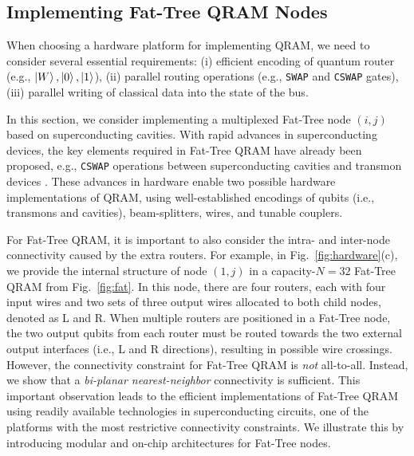 \subsection{Implementing Fat-Tree QRAM Nodes}
\label{subsec:nodes}
When choosing a hardware platform for implementing QRAM, we need to consider several essential requirements: (i) efficient encoding of quantum router  (e.g., $\ket{W}, \ket{0}, \ket{1}$), (ii) parallel routing operations (e.g., \texttt{SWAP} and \texttt{CSWAP} gates), (iii) parallel writing of classical data into the state of the bus. 

In this section, we consider implementing a multiplexed Fat-Tree node $(i,j)$ based on superconducting cavities. With rapid advances in superconducting devices, the key elements required in Fat-Tree QRAM have already been proposed, e.g., \texttt{CSWAP} operations between superconducting cavities \cite{gao2019entanglement, xue2023hybrid} and transmon devices \cite{miao2023implementation}. These advances in hardware enable two possible hardware implementations of QRAM, using well-established encodings of qubits (i.e., transmons and cavities), beam-splitters, wires, and tunable couplers. 

For Fat-Tree QRAM, it is important to also consider the intra- and inter-node connectivity caused by the extra routers. For example, in Fig.~\ref{fig:hardware}(c), we provide the internal structure of node $(1,j)$ in a capacity-$N=32$ Fat-Tree QRAM from Fig.~\ref{fig:fat}. In this node, there are four routers, each with four input wires and two sets of three output wires allocated to both child nodes, denoted as L and R. When multiple routers are positioned in a Fat-Tree node, the two output qubits from each router must be routed towards the two external output interfaces (i.e., L and R directions), resulting in possible wire crossings. However, the connectivity constraint for Fat-Tree QRAM is \emph{not} all-to-all. Instead, we show that a \emph{bi-planar nearest-neighbor} connectivity is sufficient. This important observation leads to the efficient implementations of Fat-Tree QRAM using readily available technologies in superconducting circuits, one of the platforms with the most restrictive connectivity constraints. We illustrate this by introducing modular and on-chip architectures for Fat-Tree nodes.

